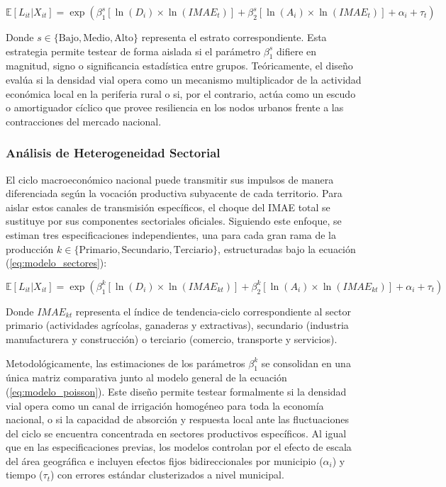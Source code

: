 \documentclass[
  spanish,
  12pt,
  letterpaper]{article}
\begin{document}
\begin{equation}
\label{eq:modelo_estratos}
\mathbb{E}[L_{it} | X_{it}] = \exp \left( \beta_{1}^s [\ln(D_i) \times \ln(IMAE_t)] + \beta_{2}^s [\ln(A_i) \times \ln(IMAE_t)] + \alpha_i + \tau_t \right)
\end{equation}

Donde \(s \in \{\text{Bajo}, \text{Medio}, \text{Alto}\}\) representa el
estrato correspondiente. Esta estrategia permite testear de forma
aislada si el parámetro \(\beta_{1}^s\) difiere en magnitud, signo o
significancia estadística entre grupos. Teóricamente, el diseño evalúa
si la densidad vial opera como un mecanismo multiplicador de la
actividad económica local en la periferia rural o si, por el contrario,
actúa como un escudo o amortiguador cíclico que provee resiliencia en
los nodos urbanos frente a las contracciones del mercado nacional.

\subsubsection{Análisis de Heterogeneidad
Sectorial}\label{anuxe1lisis-de-heterogeneidad-sectorial}

El ciclo macroeconómico nacional puede transmitir sus impulsos de manera
diferenciada según la vocación productiva subyacente de cada territorio.
Para aislar estos canales de transmisión específicos, el choque del IMAE
total se sustituye por sus componentes sectoriales oficiales. Siguiendo
este enfoque, se estiman tres especificaciones independientes, una para
cada gran rama de la producción
\(k \in \{\text{Primario}, \text{Secundario}, \text{Terciario}\}\),
estructuradas bajo la ecuación (\ref{eq:modelo_sectores}):

\begin{equation}
\label{eq:modelo_sectores}
\mathbb{E}[L_{it} | X_{it}] = \exp \left( \beta_{1}^k [\ln(D_i) \times \ln(IMAE_{kt})] + \beta_{2}^k [\ln(A_i) \times \ln(IMAE_{kt})] + \alpha_i + \tau_t \right)
\end{equation}

Donde \(IMAE_{kt}\) representa el índice de tendencia-ciclo
correspondiente al sector primario (actividades agrícolas, ganaderas y
extractivas), secundario (industria manufacturera y construcción) o
terciario (comercio, transporte y servicios).

Metodológicamente, las estimaciones de los parámetros \(\beta_{1}^k\) se
consolidan en una única matriz comparativa junto al modelo general de la
ecuación (\ref{eq:modelo_poisson}). Este diseño permite testear
formalmente si la densidad vial opera como un canal de irrigación
homogéneo para toda la economía nacional, o si la capacidad de absorción
y respuesta local ante las fluctuaciones del ciclo se encuentra
concentrada en sectores productivos específicos. Al igual que en las
especificaciones previas, los modelos controlan por el efecto de escala
del área geográfica e incluyen efectos fijos bidireccionales por
municipio (\(\alpha_i\)) y tiempo (\(\tau_t\)) con errores estándar
clusterizados a nivel municipal.
\end{document}
